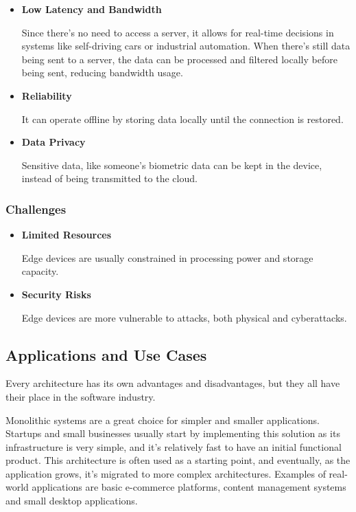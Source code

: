 \begin{itemize}


	\item \textbf{Low Latency and Bandwidth}

	      Since there's no need to access a server, it allows for real-time decisions
	      in systems like self-driving cars or industrial automation. When there's
	      still data being sent to a server, the data can be processed and filtered
	      locally before being sent, reducing bandwidth usage\cite{s20226441}.


	\item \textbf{Reliability}

	      It can operate offline by storing data locally until the connection is
	      restored\cite{MicrosoftEdgeComputing}.

	\item \textbf{Data Privacy}

	      Sensitive data, like someone's biometric data can be kept in the device,
	      instead of being transmitted to the cloud\cite{MicrosoftEdgeComputing}.

\end{itemize}

\subsubsection{Challenges}
\begin{itemize}

	\item \textbf{Limited Resources}

	      Edge devices are usually constrained in processing power and storage capacity\cite{s20226441}.

	\item \textbf{Security Risks}

	      Edge devices are more vulnerable to attacks, both physical and cyberattacks\cite{s20226441}.

\end{itemize}

\subsection{Applications and Use Cases}
Every architecture has its own advantages and disadvantages, but they all have
their place in the software industry.

Monolithic systems are a great choice for simpler and smaller applications.
Startups and small businesses usually start by implementing this solution as
its infrastructure is very simple, and it's relatively fast to have an initial
functional product. This architecture is often used as a starting point, and
eventually, as the application grows, it's migrated to more complex architectures.
Examples of real-world applications are basic e-commerce platforms, content
management systems and small desktop applications.


